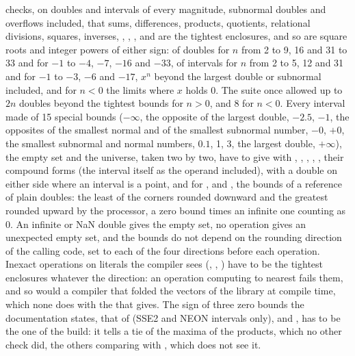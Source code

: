  checks, on doubles and intervals of every magnitude,
subnormal doubles and overflows included, that sums, differences, products,
quotients, relational divisions, squares, inverses, , ,
, \code{\&} and \code{|} are the tightest enclosures, and so are
square roots and integer powers of either sign:\newinvfive{} of doubles for
$n$ from 2 to 9, 16 and 31 to 33 and for $-1$ to $-4$, $-7$, $-16$ and
$-33$, of intervals for $n$ from 2 to 5, 12 and 31 and for $-1$ to $-3$,
$-6$ and $-17$, $x^n$ beyond the largest double or subnormal included, and
for $n<0$ the limits where $x$ holds 0. The suite once allowed up to $2n$
doubles beyond the tightest bounds for $n>0$, and 8 for $n<0$. Every
interval made of 15 special bounds ($-\infty$, the opposite of the largest double, $-2.5$,
$-1$, the opposites of the smallest normal and of the smallest subnormal
number, $-0$, $+0$, the smallest subnormal and normal numbers, $0.1$, 1, 3,
the largest double, $+\infty$), the empty set and the universe, taken two by
two, have to give with \code{+}, \code{-}, \code{*}, \code{/}, \code{\%},
their compound forms (the interval itself as the operand included), with a
double on either side where an interval is a point, and for ,
 and , the bounds of a reference of plain doubles:
the least of the corners rounded downward and the greatest rounded upward by
the processor, a zero bound times an infinite one counting as 0. An infinite
or NaN double gives the empty set, no operation gives an unexpected empty
set, and the bounds do not depend on the rounding direction of the calling
code, set to each of the four directions before each operation. Inexact
operations on literals the compiler sees (\code{[0.1] + [0.2]},
\code{[1] / [3]}, ) have to be the tightest enclosures
whatever the direction: an operation computing to nearest fails them, and so
would a compiler that folded the vectors of the library at compile time,
which none does with the  that 
gives. The sign of three zero bounds the documentation states, that of
\code{[-1, 0]*[-1, 0]} (SSE2 and NEON intervals only), 
and \code{[0, 1]/[-2, -1]}, has to be the one of the build: it tells a tie
of the maxima of the products, which no other check did, the others
comparing with \code{==}, which does not see it.

